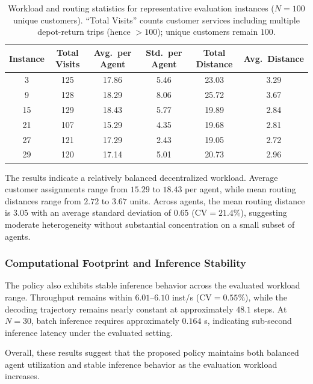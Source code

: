 \documentclass[journal,twoside,web]{ieeecolor}
\theoremstyle{definition}
\theoremstyle{remark}
\theoremstyle{definition}
\begin{document}
\begin{table}[htbp]
\centering
\caption{Workload and routing statistics for representative evaluation instances ($N{=}100$ unique customers). ``Total Visits'' counts customer services including multiple depot-return trips (hence $>100$); unique customers remain $100$.}
\label{tab:instance_stats}
\small
\begin{tabular}{cccccc}
\toprule
\textbf{Instance} & \textbf{Total Visits} & \textbf{Avg.\ per Agent}
& \textbf{Std.\ per Agent} & \textbf{Total Distance} & \textbf{Avg.\ Distance} \\
\midrule
3  & 125 & 17.86 & 5.46 & 23.03 & 3.29 \\
9  & 128 & 18.29 & 8.06 & 25.72 & 3.67 \\
15 & 129 & 18.43 & 5.77 & 19.89 & 2.84 \\
21 & 107 & 15.29 & 4.35 & 19.68 & 2.81 \\
27 & 121 & 17.29 & 2.43 & 19.05 & 2.72 \\
29 & 120 & 17.14 & 5.01 & 20.73 & 2.96 \\
\bottomrule
\end{tabular}
\end{table}

The results indicate a relatively balanced decentralized workload. Average customer assignments range from $15.29$ to $18.43$ per agent, while mean routing distances range from $2.72$ to $3.67$ units. Across agents, the mean routing distance is $3.05$ with an average standard deviation of $0.65$ ($\text{CV}=21.4\%$), suggesting moderate heterogeneity without substantial concentration on a small subset of agents.

\subsubsection{Computational Footprint and Inference Stability}

The policy also exhibits stable inference behavior across the evaluated workload range. Throughput remains within $6.01$--$6.10$ inst/s ($\text{CV}=0.55\%$), while the decoding trajectory remains nearly constant at approximately $48.1$ steps. At $N=30$, batch inference requires approximately $0.164$ s, indicating sub-second inference latency under the evaluated setting.

Overall, these results suggest that the proposed policy maintains both balanced agent utilization and stable inference behavior as the evaluation workload increases.
\end{document}
